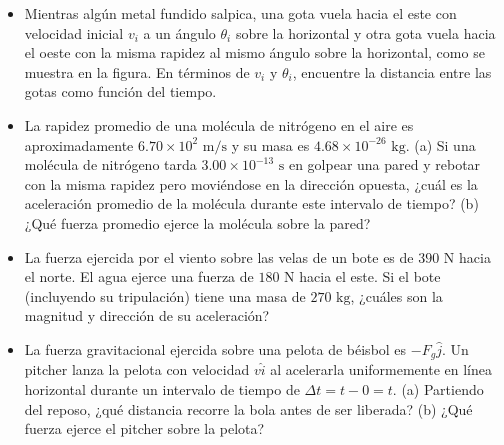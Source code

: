 \documentclass[11pt,a4paper]{article}
\begin{document}
\begin{itemize}
    \item[\textbf{13.}] Mientras algún metal fundido salpica, una gota vuela hacia el este con velocidad inicial $v_i$ a un ángulo $\theta_i$ sobre la horizontal y otra gota vuela hacia el oeste con la misma rapidez al mismo ángulo sobre la horizontal, como se muestra en la figura. En términos de $v_i$ y $\theta_i$, encuentre la distancia entre las gotas como función del tiempo.
    \vspace*{6cm}

    \item[\textbf{14.}] La rapidez promedio de una molécula de nitrógeno en el aire es aproximadamente $6.70 \times 10^2 \text{ m/s}$ y su masa es $4.68 \times 10^{-26} \text{ kg}$. (a) Si una molécula de nitrógeno tarda $3.00 \times 10^{-13} \text{ s}$ en golpear una pared y rebotar con la misma rapidez pero moviéndose en la dirección opuesta, ¿cuál es la aceleración promedio de la molécula durante este intervalo de tiempo? (b) ¿Qué fuerza promedio ejerce la molécula sobre la pared?
    \vspace*{6cm}

    \item[\textbf{15.}] La fuerza ejercida por el viento sobre las velas de un bote es de $390 \text{ N}$ hacia el norte. El agua ejerce una fuerza de $180 \text{ N}$ hacia el este. Si el bote (incluyendo su tripulación) tiene una masa de $270 \text{ kg}$, ¿cuáles son la magnitud y dirección de su aceleración?
    \vspace*{6cm}

    \item[\textbf{16.}] La fuerza gravitacional ejercida sobre una pelota de béisbol es $-F_g\hat{j}$. Un pitcher lanza la pelota con velocidad $v\hat{i}$ al acelerarla uniformemente en línea horizontal durante un intervalo de tiempo de $\Delta t = t - 0 = t$. (a) Partiendo del reposo, ¿qué distancia recorre la bola antes de ser liberada? (b) ¿Qué fuerza ejerce el pitcher sobre la pelota?
    \vspace*{6cm}
\end{itemize}

\newpage
\end{document}
